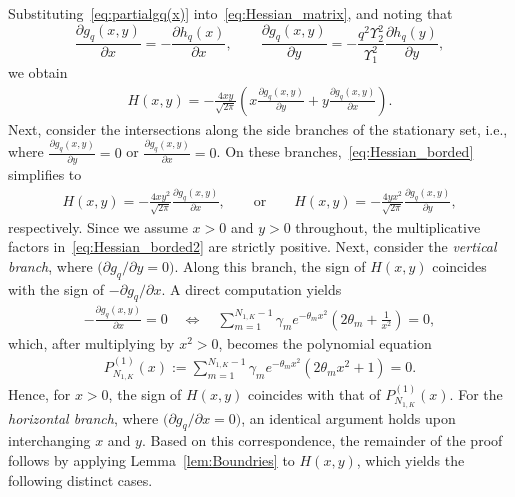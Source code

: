 \documentclass[journal,12pt,onecolumn,draftclsnofoot]{IEEEtran}
\theoremstyle{definition}
\begin{document}
Substituting~\eqref{eq:partialgq(x)} into~\eqref{eq:Hessian_matrix}, and noting that 
\[
\frac{\partial g_q(x,y)}{\partial x} = -\frac{\partial h_q(x)}{\partial x}, 
\qquad 
\frac{\partial g_q(x,y)}{\partial y} = -\frac{q^2 \Upsilon_2^2}{\Upsilon_1^2}\frac{\partial h_q(y)}{\partial y},
\]
we obtain
\begin{align}
    \label{eq:Hessian_borded}
    H(x,y) 
    = -\frac{4xy}{\sqrt{2\pi}} 
      \left( x \frac{\partial g_q(x,y)}{\partial y} 
      + y \frac{\partial g_q(x,y)}{\partial x} \right).
\end{align}
Next, consider the intersections along the side branches of the stationary set, i.e., where 
$\frac{\partial g_q(x,y)}{\partial y} = 0$ or $\frac{\partial g_q(x,y)}{\partial x} = 0$. 
On these branches,~\eqref{eq:Hessian_borded} simplifies to
\begin{align}
    \label{eq:Hessian_borded2}
    H(x,y) = -\frac{4xy^2}{\sqrt{2\pi}} \frac{\partial g_q(x,y)}{\partial x},
    \qquad \text{or} \qquad
    H(x,y) = -\frac{4yx^2}{\sqrt{2\pi}} \frac{\partial g_q(x,y)}{\partial y},
\end{align}
respectively. Since we assume $x > 0$ and $y > 0$ throughout, the multiplicative factors in~\eqref{eq:Hessian_borded2} are strictly positive. Next, consider the \emph{vertical branch}, where $\big(\partial g_q / \partial y = 0\big)$. 
Along this branch, the sign of $H(x,y)$ coincides with the sign of $-\partial g_q / \partial x$. A direct computation yields
\begin{align}
    -\frac{\partial g_q(x,y)}{\partial x} = 0
    \quad \Longleftrightarrow \quad
    \sum_{m=1}^{N_{1,K}-1} \gamma_m e^{-\theta_m x^2} 
    \left( 2\theta_m + \frac{1}{x^2} \right) = 0,
\end{align}
which, after multiplying by $x^2 > 0$, becomes the polynomial equation
\begin{align}
    P^{(1)}_{N_{1,K}}(x) 
    := \sum_{m=1}^{N_{1,K}-1} 
    \gamma_m e^{-\theta_m x^2} (2\theta_m x^2 + 1) = 0.
\end{align}
Hence, for $x > 0$, the sign of $H(x,y)$ coincides with that of $P^{(1)}_{N_{1,K}}(x)$. 
For the \emph{horizontal branch}, where $\big(\partial g_q / \partial x = 0\big)$, an identical argument holds upon interchanging $x$ and $y$. 
Based on this correspondence, the remainder of the proof follows by applying Lemma~\ref{lem:Boundries} to $H(x,y)$, which yields the following distinct cases.
 
\end{document}
